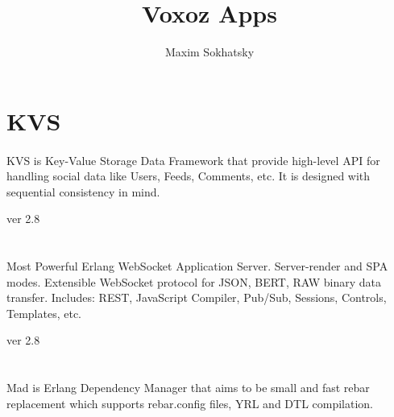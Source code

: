 \documentclass[11pt]{article}
\begin{document}
\title{Voxoz Apps}
\author{Maxim Sokhatsky}


\section*{KVS}
\paragraph{}
KVS is Key-Value Storage Data Framework that provide high-level API for handling
social data like Users, Feeds, Comments, etc. It is designed with sequential consistency in mind.

 ver 2.8


\section*{}

\paragraph{}
Most Powerful Erlang WebSocket Application Server. Server-render and SPA modes.
Extensible WebSocket protocol for JSON, BERT, RAW binary data transfer.
Includes: REST, JavaScript Compiler, Pub/Sub, Sessions, Controls, Templates, etc.

 ver 2.8

\section*{}

\paragraph{}
Mad is Erlang Dependency Manager that aims to be small and fast rebar
replacement which supports rebar.config files, YRL and DTL compilation.
\end{document}
